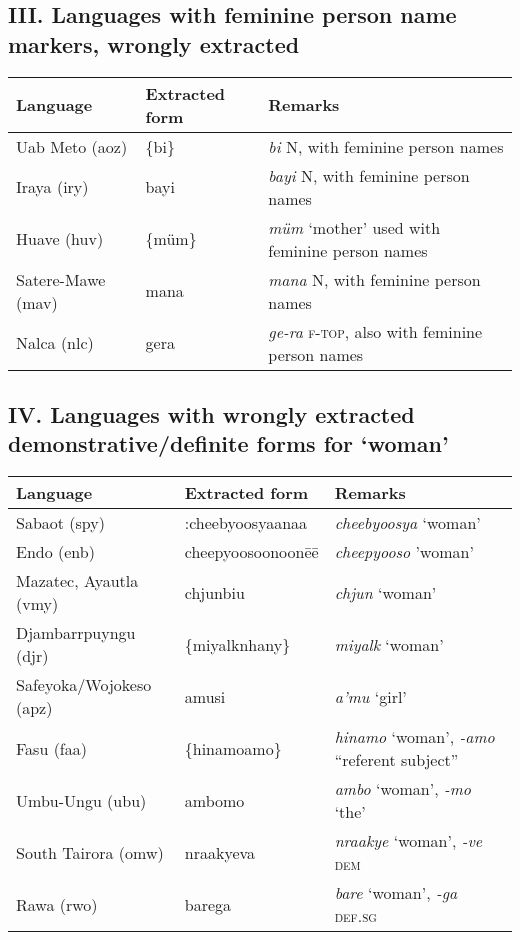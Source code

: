 \subsection*{III. Languages with feminine person name markers, wrongly extracted \normalfont [6 languages]}

{%
\setlength\tabcolsep{1.5pt}
\small
\begin{tabular}{L{.25\textwidth}L{.25\textwidth}L{.5\textwidth}}
\toprule
\bfseries Language & \bfseries Extracted form & \bfseries Remarks \\
\midrule
Uab Meto (aoz)	&	\{bi\}	&	\textit{bi} N, with feminine person names	\\
Iraya (iry)	&	bayi	&	\textit{bayi} N, with feminine person names	\\
Huave (huv)	&	\{müm\}	&	\textit{müm} ‘mother’ used with feminine person names 	\\
Satere-Mawe (mav)	&	mana	&	\textit{mana} N, with feminine person names	\\
Nalca (nlc)	&	gera	&	\textit{ge-ra} \textsc{f-top}, also with feminine person names	\\
\bottomrule
\end{tabular}
}%



\subsection*{IV. Languages with wrongly extracted demonstrative/definite forms for ‘woman’
\normalfont [9 languages]}

{%
\setlength\tabcolsep{1.5pt}
\small
\begin{tabular}{L{.25\textwidth}L{.25\textwidth}L{.5\textwidth}}
\toprule
\bfseries Language & \bfseries Extracted form & \bfseries Remarks \\
\midrule
Sabaot (spy)	&	:cheebyoosyaanaa	&	\textit{cheebyoosya} ‘woman’	\\
Endo (enb)	&	cheepyoosoonoonēē	&	\textit{cheepyooso} ’woman’	\\
Mazatec, Ayautla (vmy)	&	chjunbiu	&	\textit{chjun} ‘woman’	\\
Djambarrpuyngu (djr)	&	\{miyalknhany\}	&	\textit{miyalk} ‘woman’	\\
Safeyoka/Wojokeso (apz)	&	a\textquotesingle{}musi	&	\textit{a'mu} ‘girl’	\\
Fasu (faa)	&	\{hinamoamo\}	&	\textit{hinamo} ‘woman’, \textit{-amo} “referent subject”	\\
Umbu-Ungu (ubu)	&	ambomo	&	\textit{ambo} ‘woman’, \textit{-mo} ‘the’	\\
South Tairora (omw)	&	nraakyeva	&	\textit{nraakye} ‘woman’, \textit{-ve} \textsc{dem}	\\
Rawa (rwo)	&	barega	&	\textit{bare} ‘woman’, \textit{-ga} \textsc{def.sg}	\\
\bottomrule
\end{tabular}
}%


